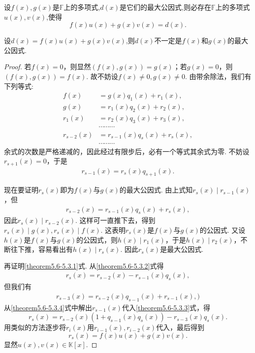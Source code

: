 \documentclass[../../main.tex]{subfiles}
\begin{document}
\begin{theorem}[最大公因式的必要条件]\label{theorem:最大公因式的必要条件}
设\(f(x),g(x)\)是\(\mathbb{F}\)上的多项式,\(d(x)\)是它们的最大公因式,则必存在\(\mathbb{F}\)上的多项式\(u(x),v(x)\),使得\[f(x)u(x)+g(x)v(x)=d(x).\]
\end{theorem}
\begin{remark}
设\(d(x)=f(x)u(x)+g(x)v(x)\),则\(d(x)\)不一定是\(f(x)\)和\(g(x)\)的最大公因式.
\end{remark}
\begin{proof}
若\(f(x)=0\)，则显然\((f(x),g(x)) = g(x)\)；若\(g(x)=0\)，则\((f(x),g(x)) = f(x)\). 故不妨设\(f(x)\neq 0,g(x)\neq 0\). 由带余除法，我们有下列等式:
\begin{align*}
f(x)&=g(x)q_1(x)+r_1(x),\\
g(x)&=r_1(x)q_2(x)+r_2(x),\\
r_1(x)&=r_2(x)q_3(x)+r_3(x),\\
&\cdots\cdots\cdots\\
r_{s - 2}(x)&=r_{s - 1}(x)q_s(x)+r_s(x),\\
&\cdots\cdots\cdots
\end{align*}
余式的次数是严格递减的，因此经过有限步后，必有一个等式其余式为零. 不妨设\(r_{s + 1}(x)=0\)，于是
\begin{align}
r_{s - 1}(x)=r_s(x)q_{s + 1}(x). \label{theorem5.6-5.3.1}
\end{align}

现在要证明\(r_s(x)\)即为\(f(x)\)与\(g(x)\)的最大公因式. 由上式知\(r_s(x)\mid r_{s - 1}(x)\)，但
\begin{align}
r_{s - 2}(x)=r_{s - 1}(x)q_s(x)+r_s(x),\label{theorem5.6-5.3.2}   
\end{align}
因此\(r_s(x)\mid r_{s - 2}(x)\). 这样可一直推下去，得到\(r_s(x)\mid g(x),r_s(x)\mid f(x)\). 这表明\(r_s(x)\)是\(f(x)\)与\(g(x)\)的公因式. 又设\(h(x)\)是\(f(x)\)与\(g(x)\)的公因式，则\(h(x)\mid r_1(x)\)，于是\(h(x)\mid r_2(x)\)，不断往下推，容易看出有\(h(x)\mid r_s(x)\). 因此\(r_s(x)\)是最大公因式.

再证明\eqref{theorem5.6-5.3.1}式. 从\eqref{theorem5.6-5.3.2}式得
\begin{align}
r_s(x)=r_{s - 2}(x)-r_{s - 1}(x)q_s(x),\label{theorem5.6-5.3.3}    
\end{align}
但我们有
\begin{align}
r_{s - 3}(x)=r_{s - 2}(x)q_{s - 1}(x)+r_{s - 1}(x),\label{theorem5.6-5.3.4})    
\end{align}
从\eqref{theorem5.6-5.3.4}式中解出\(r_{s - 1}(x)\)代入\eqref{theorem5.6-5.3.3}式，得
\[
r_s(x)=r_{s - 2}(x)(1 + q_{s - 1}(x)q_s(x))-r_{s - 3}(x)q_s(x).
\]
用类似的方法逐步将\(r_i(x)\)用\(r_{i - 1}(x),r_{i - 2}(x)\)代入，最后得到
\[
r_s(x)=f(x)u(x)+g(x)v(x).
\]
显然\(u(x),v(x)\in\mathbb{K}[x]\).
\end{proof}
\end{document}
